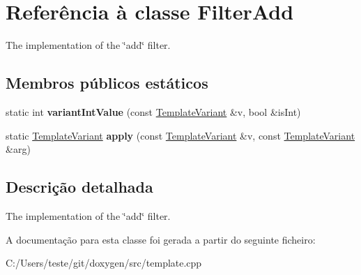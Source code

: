 \hypertarget{class_filter_add}{\section{Referência à classe Filter\-Add}
\label{class_filter_add}
}


The implementation of the \char`\"{}add\char`\"{} filter.  


\subsection*{Membros públicos estáticos}
\begin{DoxyCompactItemize}
\item 
\hypertarget{class_filter_add_a8148c5dd3b48023ad0244f71a40eb5c3}{static int {\bfseries variant\-Int\-Value} (const \hyperlink{class_template_variant}{Template\-Variant} \&v, bool \&is\-Int)}\label{class_filter_add_a8148c5dd3b48023ad0244f71a40eb5c3}

\item 
\hypertarget{class_filter_add_a3987885c759841073f6ba1225c0cd2b8}{static \hyperlink{class_template_variant}{Template\-Variant} {\bfseries apply} (const \hyperlink{class_template_variant}{Template\-Variant} \&v, const \hyperlink{class_template_variant}{Template\-Variant} \&arg)}\label{class_filter_add_a3987885c759841073f6ba1225c0cd2b8}

\end{DoxyCompactItemize}


\subsection{Descrição detalhada}
The implementation of the \char`\"{}add\char`\"{} filter. 

A documentação para esta classe foi gerada a partir do seguinte ficheiro\-:\begin{DoxyCompactItemize}
\item 
C\-:/\-Users/teste/git/doxygen/src/template.\-cpp\end{DoxyCompactItemize}

